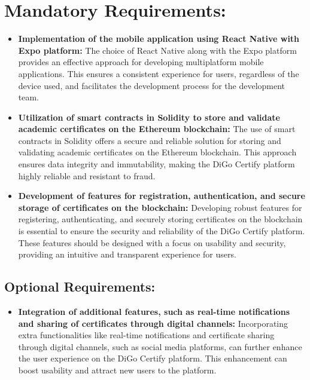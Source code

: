 \section{Mandatory Requirements:}

\begin{itemize}

    \item \textbf{Implementation of the mobile application using React Native with Expo platform:} The choice of React Native along with the Expo platform provides an effective approach for developing multiplatform mobile applications. This ensures a consistent experience for users, regardless of the device used, and facilitates the development process for the development team.

    \item \textbf{Utilization of smart contracts in Solidity to store and validate academic certificates on the Ethereum blockchain:} The use of smart contracts in Solidity offers a secure and reliable solution for storing and validating academic certificates on the Ethereum blockchain. This approach ensures data integrity and immutability, making the DiGo Certify platform highly reliable and resistant to fraud.

    \item \textbf{Development of features for registration, authentication, and secure storage of certificates on the blockchain:} Developing robust features for registering, authenticating, and securely storing certificates on the blockchain is essential to ensure the security and reliability of the DiGo Certify platform. These features should be designed with a focus on usability and security, providing an intuitive and transparent experience for users.

\end{itemize}

\subsection{Optional Requirements:}

\begin{itemize}

    \item \textbf{Integration of additional features, such as real-time notifications and sharing of certificates through digital channels:} Incorporating extra functionalities like real-time notifications and certificate sharing through digital channels, such as social media platforms, can further enhance the user experience on the DiGo Certify platform. This enhancement can boost usability and attract new users to the platform.
    
\end{itemize}

